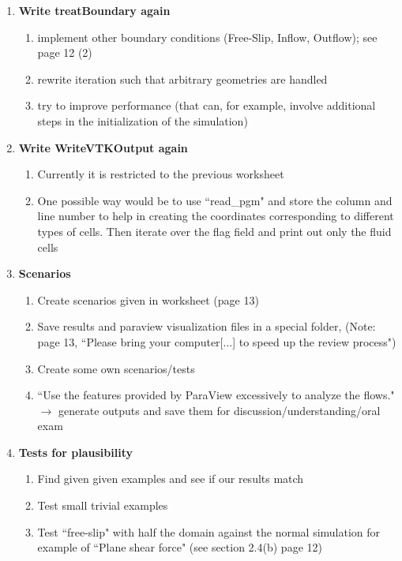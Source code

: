\documentclass[a4paper]{article}
\newcommand{\qm}[1]{``#1"}							%
\newcommand{\ra}{\rightarrow}						%
\begin{document}
\begin{enumerate}
\item  \textbf{Write treatBoundary again}
\begin{enumerate}
\item implement other boundary conditions (Free-Slip, Inflow, Outflow); see page 12 (2)
\item rewrite iteration such that arbitrary geometries are handled
\item try to improve performance (that can, for example, involve additional steps in the initialization of the simulation)
\end{enumerate}

\item \textbf{Write WriteVTKOutput again}
\begin{enumerate}
	\item Currently it is restricted to the previous worksheet
	\item One possible way would be to use \qm{read\_pgm} and store the column and line number to help in creating the coordinates corresponding to different types of cells. Then iterate over the flag field and print out only the fluid cells
\end{enumerate}

\item \textbf{Scenarios}
\begin{enumerate}
\item Create scenarios given in worksheet (page 13)
\item Save results and paraview visualization files in a special folder, (Note: page 13, \qm{Please bring your computer[...] to speed up the review process})
\item Create some own scenarios/tests
\item \qm{Use the features provided by ParaView excessively to analyze the flows.} $ \ra $ generate outputs and save them for discussion/understanding/oral exam
\end{enumerate}

\item \textbf{Tests for plausibility}
\begin{enumerate}
\item Find given given examples and see if our results match
\item Test small trivial examples
\item Test \qm{free-slip} with half the domain against the normal simulation for example of \qm{Plane shear force} (see section 2.4(b) page 12)
\end{enumerate}

\end{enumerate} 
\end{document}
